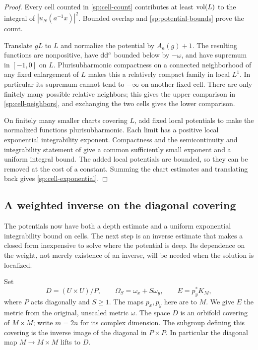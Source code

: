 \begin{proof}
Every cell counted in \eqref{sp:cell-count} contributes at least
$\operatorname{vol}(L)$ to the integral of $|u_N(a^{-1}x)|^2$.  Bounded overlap and
\eqref{sp:potential-bounds} prove the count.

Translate $gL$ to $L$ and normalize the potential by $A_a(g)+1$.
The resulting functions are nonpositive, have $\mathrm d\mathrm d^c$ bounded below
by $-\omega$, and have supremum in $[-1,0]$ on $L$.  Plurisubharmonic
compactness on a connected neighborhood of any fixed enlargement of
$L$ makes this a relatively compact family in local $L^1$.  In
particular its supremum cannot tend to $-\infty$ on another fixed
cell.  There are only finitely many possible relative neighbors; this
gives the upper comparison in \eqref{sp:cell-neighbors}, and exchanging
the two cells gives the lower comparison.

On finitely many smaller charts covering $L$, add fixed local potentials
to make the normalized functions plurisubharmonic.  Each limit has a
positive local exponential integrability exponent.  Compactness and the
semicontinuity and integrability statement of
\cite[Main Theorem~0.2]{DemaillyKollar2001} give a common sufficiently
small exponent and a uniform integral bound.  The added local potentials
are bounded, so they can be removed at the cost of a constant.  Summing
the chart estimates and translating back gives
\eqref{sp:cell-exponential}.
\end{proof}

\subsection{A weighted inverse on the diagonal covering}
\label{sp:weighted}

The potentials now have both a depth estimate and a uniform exponential
integrability bound on cells. The next step is an inverse estimate
that makes a closed form inexpensive to solve where the potential is
deep. Its dependence on the weight, not merely existence of an inverse,
will be needed when the solution is localized.

Set
\[
 D=(U\times U)/P,\qquad \Omega_S=\omega_x+S\omega_y,
 \qquad E=p_y^*K_M,
\]
where $P$ acts diagonally and $S\ge1$.  The maps $p_x,p_y$ here are to
$M$.  We give $E$ the metric from the original, unscaled metric
$\omega$.  The space $D$ is an orbifold covering of $M\times M$;
write $m=2n$ for its complex dimension.  The subgroup defining this
covering is the inverse image of the diagonal in $P\times P$.
In particular the diagonal map $M\to M\times M$ lifts to $D$.

